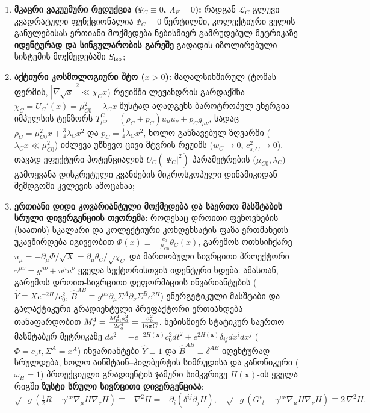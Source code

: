 \documentclass[11pt,a4paper]{article}
\begin{document}
\begin{enumerate}[label=\arabic*.]
\item \textbf{მკაცრი ვაკუუმური რედუქცია ($\Psi_C \equiv 0$, $\Lambda_F = 0$):} რადგან $\mathcal{L}_C$ გლუვი კვადრატული ფუნქციონალია $\Psi_C = 0$ წერტილში, კოლექტიური ველის განულებისას ერთიანი მოქმედება ნებისმიერ გამრუდებულ მეტრიკაზე \textbf{იდენტურად და სინგულარობის გარეშე} გადადის იზოლირებული სისტემის მოქმედებაში $S_{\rm iso}$;
\item \textbf{აქტიური კოსმოლოგიური შტო ($x > 0$):} მაღალსიხშირულ (ტომას–ფერმის, $|\nabla\sqrt{x}|^2 \ll \chi_C x$) რეჟიმში ლეჟანდრის გარდაქმნა $\chi_C = U_C'(x) = \mu_{C0}^2 + \lambda_C x$ ზუსტად აღადგენს ბაროტროპულ ენერგია–იმპულსის ტენზორს $T^C_{\mu\nu} = (\rho_C + p_C)u_\mu u_\nu + p_C g_{\mu\nu}$, სადაც $\rho_C = \mu_{C0}^2 x + \frac{3}{4}\lambda_C x^2$ და $p_C = \frac{1}{4}\lambda_C x^2$, ხოლო განზავებულ ზღვარში ($\lambda_C x \ll \mu_{C0}^2$) იძლევა უწნევო ცივი მტვრის რეჟიმს ($w_C \to 0$, $c_{s,C}^2 \to 0$). თავად ეფექტური პოტენციალის $U_C(|\Psi_C|^2)$ პარამეტრების ($\mu_{C0}, \lambda_C$) გამოყვანა დისკრეტული კვანძების მიკროსკოპული დინამიკიდან შემდგომი კვლევის ამოცანაა;
\item \textbf{ერთიანი დიდი კოვარიანტული მოქმედება და საერთო მასშტაბის სრული დივერგენციის თეორემა:} როდესაც დროითი ფენოვნების (საათის) სკალარი და კოლექტიური კონდენსატის ფაზა ერთმანეთს უკავშირდება იგივეობით $\Phi(x) \equiv -\frac{c_0}{\mu_{C0}}\theta_C(x)$, გარემოს ოთხსიჩქარე $u_\mu = -\partial_\mu\Phi/\sqrt{X} = \partial_\mu\theta_C/\sqrt{\chi_C}$ და მართობული სივრცითი პროექტორი $\gamma^{\mu\nu} = g^{\mu\nu} + u^\mu u^\nu$ ყველა სექტორისთვის იდენტური ხდება. ამასთან, გარემოს დროით-სივრცითი დეფორმაციის ინვარიანტების ($\widehat{Y} \equiv X e^{-2H}/c_0^2$, $\widehat{B}^{AB} \equiv g^{\mu\nu}\partial_\mu\Sigma^A\partial_\nu\Sigma^B e^{2H}$) ენერგეტიკული მასშტაბი და გალაქტიკური გრადიენტული პრეფაქტორი ერთიანდება თანაფარდობით $M_*^4 = \frac{M_{\rm Pl}^2 a_0^2}{2 c_0^4} = \frac{a_0^2}{16\pi G}$. ნებისმიერ სტატიკურ საერთო-მასშტაბურ მეტრიკაზე $ds^2 = -e^{-2H(\mathbf{x})}c_0^2 dt^2 + e^{2H(\mathbf{x})}\delta_{ij}dx^i dx^j$ ($\Phi = c_0 t, \Sigma^A = x^A$) ინვარიანტები $\widehat{Y} \equiv 1$ და $\widehat{B}^{AB} \equiv \delta^{AB}$ იდენტურად სრულდება, ხოლო აინშტაინ–ჰილბერტის სიმრუდისა და კანონიკური ($\omega_H = 1$) პროექციული გრადიენტის ჯამური სიმკვრივე $H(\mathbf{x})$-ის ყველა რიგში \textbf{ზუსტი სრული სივრცითი დივერგენციაა}:
\[
   \sqrt{-g}\left(\tfrac{1}{2}R + \gamma^{\mu\nu}\nabla_\mu H\nabla_\nu H\right) \equiv -\nabla^2 H = -\partial_i(\delta^{ij}\partial_j H), \quad \sqrt{-g}\left(G^t{}_t - \gamma^{\mu\nu}\nabla_\mu H\nabla_\nu H\right) \equiv 2\,\nabla^2 H.
\]
\end{enumerate}
\end{document}
